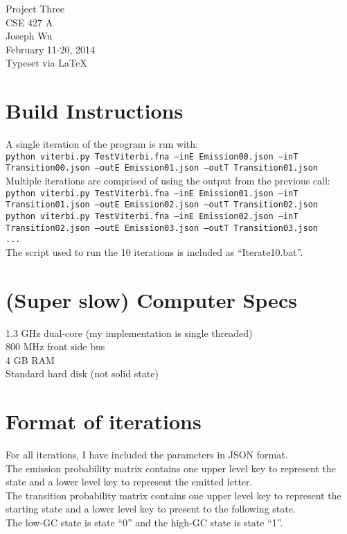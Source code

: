 \documentclass[a4paper, 12pt]{report}
\begin{document}
    \begin{center}
        {\LARGE Project Three} \\
        CSE 427 A \\
        Joseph Wu  \\
        February 11-20, 2014 \\
        {\tiny Typeset via \LaTeX}
    \end{center}

\section{Build Instructions}
    A single iteration of the program is run with: \\
    \texttt{python viterbi.py TestViterbi.fna --inE Emission00.json --inT Transition00.json --outE Emission01.json --outT Transition01.json} \\

    \noindent Multiple iterations are comprised of using the output from the previous call: \\
    \texttt{python viterbi.py TestViterbi.fna --inE Emission01.json --inT Transition01.json --outE Emission02.json --outT Transition02.json} \\
    \texttt{python viterbi.py TestViterbi.fna --inE Emission02.json --inT Transition02.json --outE Emission03.json --outT Transition03.json} \\
    \texttt{...} \\

    \noindent The script used to run the 10 iterations is included as ``Iterate10.bat''.

\section{(Super slow) Computer Specs}
    1.3 GHz dual-core (my implementation is single threaded) \\
    800 MHz front side bus \\
    4 GB RAM \\
    Standard hard disk (not solid state)

\section{Format of iterations}
    For all iterations, I have included the parameters in JSON format. \\
    The emission probability matrix contains one upper level key to represent the state
        and a lower level key to represent the emitted letter. \\
    The transition probability matrix contains one upper level key to represent the starting state
        and a lower level key to present to the following state.  \\
    The low-GC state is state ``0''
        and the high-GC state is state ``1''.
\end{document}

